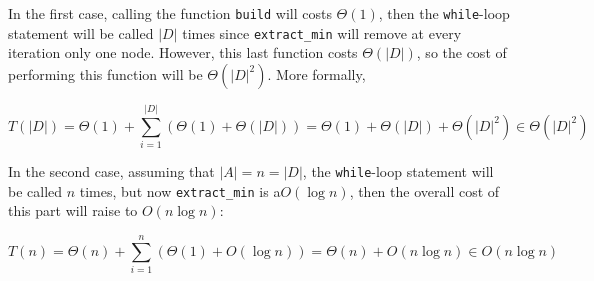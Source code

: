 \documentclass{article}
\begin{document}
	
	\noindent In the first case, calling the function \texttt{build} will costs $\Theta(1)$, then the \texttt{while}-loop statement will be called $|D|$ times since \texttt{extract\_min} will remove at every iteration only one node. However, this last function costs $\Theta(|D|)$, so the cost of performing this function will be $\Theta(|D|^2)$. More formally,
	
	\begin{equation*}
	T(|D|) = \Theta(1) + \sum_{i=1}^{|D|} (\Theta(1)+\Theta(|D|)) = \Theta(1) + \Theta(|D|) + \Theta(|D|^2) \in \Theta(|D|^2) 
	\end{equation*}
	 
	 \noindent In the second case, assuming that $|A| = n = |D|$, the \texttt{while}-loop statement will be called $n$ times, but now \texttt{extract\_min} is a$O(\log n)$, then the overall cost of this part will raise to $O(n \log n)$:
	 
	 \begin{equation*}
	 T(n) = \Theta(n) + \sum_{i=1}^{n} (\Theta(1)+O(\log n)) = \Theta(n) + O(n \log n) \in O(n \log n) 
	 \end{equation*}
	
\end{document}
